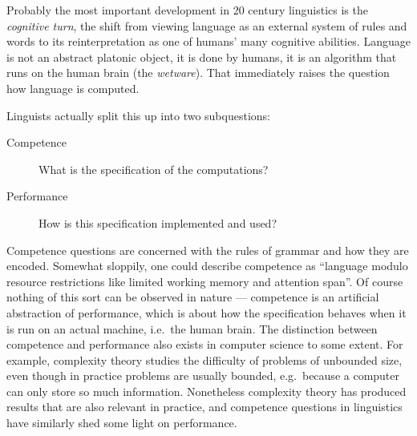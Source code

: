 Probably the most important development in 20 century linguistics is the \emph{cognitive turn}, the shift from viewing language as an external system of rules and words to its reinterpretation as one of humans' many cognitive abilities.
Language is not an abstract platonic object, it is done by humans, it is an algorithm that runs on the human brain (the \emph{wetware}).
That immediately raises the question how language is computed.

Linguists actually split this up into two subquestions:
%
\begin{description}
    \item[Competence] What is the specification of the computations?
    \item[Performance] How is this specification implemented and used?
\end{description}
%
Competence questions are concerned with the rules of grammar and how they are encoded.
Somewhat sloppily, one could describe competence as ``language modulo resource restrictions like limited working memory and attention span''.
Of course nothing of this sort can be observed in nature --- competence is an artificial abstraction of performance, which is about how the specification behaves when it is run on an actual machine, i.e.\ the human brain.
The distinction between competence and performance also exists in computer science to some extent.
For example, complexity theory studies the difficulty of problems of unbounded size, even though in practice problems are usually bounded, e.g.\ because a computer can only store so much information.
Nonetheless complexity theory has produced results that are also relevant in practice, and competence questions in linguistics have similarly shed some light on performance.

